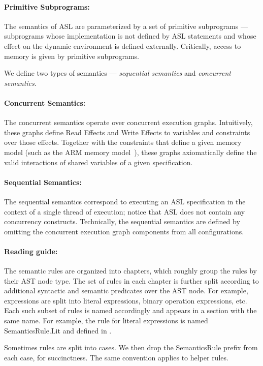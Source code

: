 \documentclass{book}
\begin{document}
\paragraph{Primitive Subprograms:}
The semantics of ASL are parameterized by a set of primitive subprograms ---
subprograms whose implementation is not defined by ASL statements and whose effect on the dynamic environment
is defined externally. Critically, access to memory is given by primitive subprograms.

We define two types of semantics --- \emph{sequential semantics} and \emph{concurrent semantics}.

\paragraph{Concurrent Semantics:}
The concurrent semantics operate over concurrent execution graphs.
Intuitively, these graphs define Read Effects and Write Effects to variables and constraints over those effects.
Together with the constraints that define a given memory model (such as the ARM memory model~\cite{AlglaveDGHM21}),
these graphs axiomatically define
the valid interactions of shared variables of a given specification.

\paragraph{Sequential Semantics:}
The sequential semantics correspond to executing an ASL specification in the context of a single thread
of execution; notice that ASL does not contain any concurrency constructs.
%
Technically, the sequential semantics are defined by omitting the concurrent execution graph components
from all configurations.

\paragraph{Reading guide:}
The semantic rules are organized into chapters, which roughly group the rules
by their AST node type.  The set of rules in each chapter is further split
according to additional syntactic and semantic predicates over the AST node.
For example, expressions are split into literal expressions, binary operation
expressions, etc.  Each such subset of rules is named accordingly and appears
in a section with the same name.  For example, the rule for literal expressions
is named SemanticsRule.Lit and defined in .

Sometimes rules are split into cases.  We then drop the SemanticsRule prefix
from each case, for succinctness.  The same convention applies to helper rules.
\end{document}

